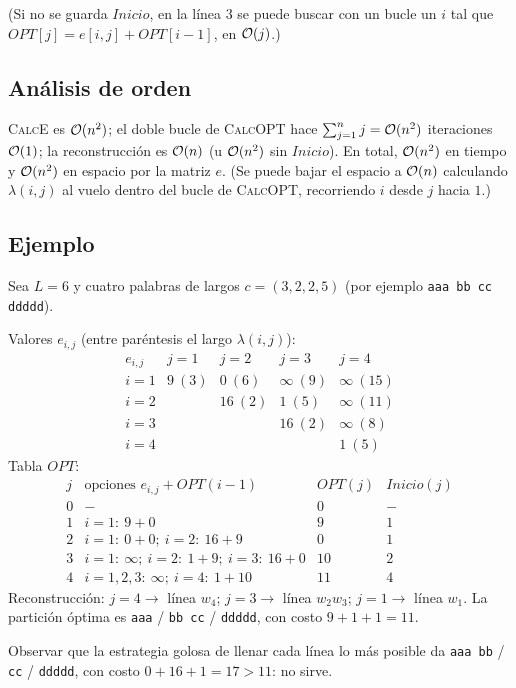 (Si no se guarda $Inicio$, en la línea 3 se puede buscar con un bucle un $i$ tal que $OPT[j]=e[i,j]+OPT[i-1]$, en $\mathcal{O}(j)$.)

\subsection*{Análisis de orden}

\textsc{CalcE} es $\mathcal{O}(n^2)$; el doble bucle de \textsc{CalcOPT} hace $\sum_{j=1}^n j=\mathcal{O}(n^2)$ iteraciones $\mathcal{O}(1)$; la reconstrucción es $\mathcal{O}(n)$ (u $\mathcal{O}(n^2)$ sin $Inicio$). En total, $\mathcal{O}(n^2)$ en tiempo y $\mathcal{O}(n^2)$ en espacio por la matriz $e$. (Se puede bajar el espacio a $\mathcal{O}(n)$ calculando $\lambda(i,j)$ al vuelo dentro del bucle de \textsc{CalcOPT}, recorriendo $i$ desde $j$ hacia $1$.)

\subsection*{Ejemplo}

Sea $L=6$ y cuatro palabras de largos $c=(3,2,2,5)$ (por ejemplo \texttt{aaa bb cc ddddd}).

Valores $e_{i,j}$ (entre paréntesis el largo $\lambda(i,j)$):
\[
\begin{array}{c|cccc}
e_{i,j} & j=1 & j=2 & j=3 & j=4\\\hline
i=1 & 9\ (3) & 0\ (6) & \infty\ (9) & \infty\ (15)\\
i=2 & & 16\ (2) & 1\ (5) & \infty\ (11)\\
i=3 & & & 16\ (2) & \infty\ (8)\\
i=4 & & & & 1\ (5)
\end{array}
\]
Tabla $OPT$:
\[
\begin{array}{c|l|c|c}
j & \text{opciones } e_{i,j}+OPT(i-1) & OPT(j) & Inicio(j)\\\hline
0 & - & 0 & -\\
1 & i=1:\ 9+0 & 9 & 1\\
2 & i=1:\ 0+0;\ i=2:\ 16+9 & 0 & 1\\
3 & i=1:\ \infty;\ i=2:\ 1+9;\ i=3:\ 16+0 & 10 & 2\\
4 & i=1,2,3:\ \infty;\ i=4:\ 1+10 & 11 & 4
\end{array}
\]
Reconstrucción: $j=4\to$ línea $w_4$; $j=3\to$ línea $w_2w_3$; $j=1\to$ línea $w_1$. La partición óptima es
\texttt{aaa} / \texttt{bb cc} / \texttt{ddddd}, con costo $9+1+1=11$.

Observar que la estrategia golosa de llenar cada línea lo más posible da \texttt{aaa bb} / \texttt{cc} / \texttt{ddddd}, con costo $0+16+1=17>11$: no sirve.

